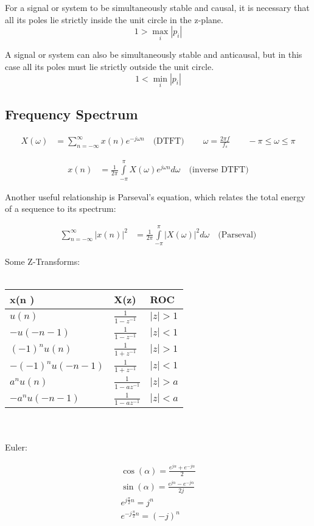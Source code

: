 For a signal or system to be simultaneously stable and causal, it is necessary that all its poles lie strictly inside the unit circle in the z-plane. 
\[ 1 > \max\limits_{i}|p_i| \]

A signal or system
can also be simultaneously stable and anticausal, but in this case all its poles must lie
strictly outside the unit circle.
\[ 1 < \min\limits_{i}|p_i| \]

\subsection{Frequency Spectrum}
\begin{align*}
	X(\omega)&= \sum\limits_{n=-\infty}^{\infty} x(n)e^{-j\omega n} \quad \text{(DTFT)} \
	\qquad \omega = \frac{2 \pi f}{f_s} \qquad -\pi \leq \omega \leq \pi
\end{align*}

\begin{align*}
	x(n)&= \frac{1}{2\pi} \int\limits_{-\pi}^{\pi} X(\omega)e^{j\omega n} d\omega \quad \text{(inverse DTFT)} 
\end{align*}

Another useful relationship is Parseval’s equation, which relates the total energy of
a sequence to its spectrum:

\begin{align*}
	\sum_{n=-\infty}^{\infty} |x(n)|^2&= \frac{1}{2\pi} \int\limits_{-\pi}^{\pi} |X(\omega)|^2 d\omega \quad \text{(Parseval)} 
\end{align*}

Some Z-Transforms: \\ \\
\begin{tabularx}{0.6\textwidth}{|X|X|X|}
	\hline
	\textbf{x(n} ) & \textbf{X(z}) & \textbf{ROC} \\
	\hline
	$u(n)$ & $\frac{1}{1 - z^{-1}}$ & $|z|>1$ \\
	\hline
	$-u(-n-1)$ & $\frac{1}{1 - z^{-1}}$ & $|z|<1$ \\
	\hline
	$(-1)^n u(n)$ & $\frac{1}{1 + z^{-1}}$ & $|z|>1$ \\
	\hline
	$-(-1)^n u(-n-1)$ & $\frac{1}{1 + z^{-1}}$ & $|z|<1$ \\
	\hline
	$a^n u(n)$ & $\frac{1}{1 - az^{-1}}$ & $|z|>a$ \\
	\hline
	$-a^n u(-n-1)$ & $\frac{1}{1 - az^{-1}}$ & $|z|<a$ \\
	\hline
\end{tabularx}\\ \\

Euler: 

\begin{align*}
	\cos(\alpha) = \frac{e^{j\alpha} + e^{-j\alpha}}{2} \\
	\sin(\alpha) = \frac{e^{j\alpha} - e^{-j\alpha}}{2j} \\
	e^{j\frac{\pi}{2}n} = j^n\\
	e^{-j\frac{\pi}{2}n} = (-j)^n\\
\end{align*}

